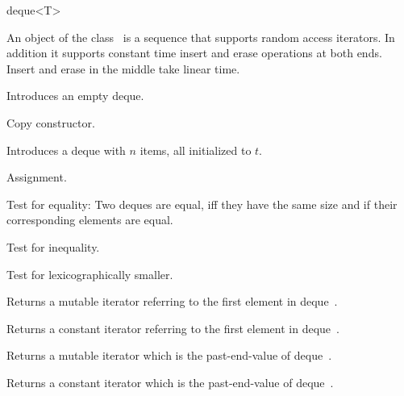 
\ccHtmlNoClassLinks
\begin{ccClassTemplate} {deque<T>}


\ccDefinition
An object of the class \ccClassName\ is a sequence that supports
random access iterators. In addition it supports 
constant time insert and erase operations at both ends.  Insert and erase 
in the middle take linear time.




\ccTypes
{}


\ccCreation
{}

             {Introduces an empty deque.}

 	    {Copy constructor.}

            {Introduces a deque with $n$ items, all initialized to $t$.}

\ccOperations
\ccSetTwoOfThreeColumns{3.5cm}{3.1cm}

        {Assignment.}


       {Test for equality: Two deques are equal, iff they have the same size
        and if their corresponding elements are equal.}

       {Test for inequality.}

       {Test for lexicographically smaller.}


       {Returns a mutable iterator referring to the first element in
        deque~\ccVar.}

\renewcommand{\ccTagRmTrailingConst}{\ccFalse}
       {Returns a constant iterator referring to the first element in
        deque~\ccVar.}
\renewcommand{\ccTagRmTrailingConst}{\ccTrue}


       {Returns a mutable iterator which is the past-end-value of
        deque~\ccVar.}

\renewcommand{\ccTagRmTrailingConst}{\ccFalse}
       {Returns a constant iterator which is the past-end-value of 
        deque~\ccVar.}
\renewcommand{\ccTagRmTrailingConst}{\ccTrue}



\end{ccClassTemplate}
